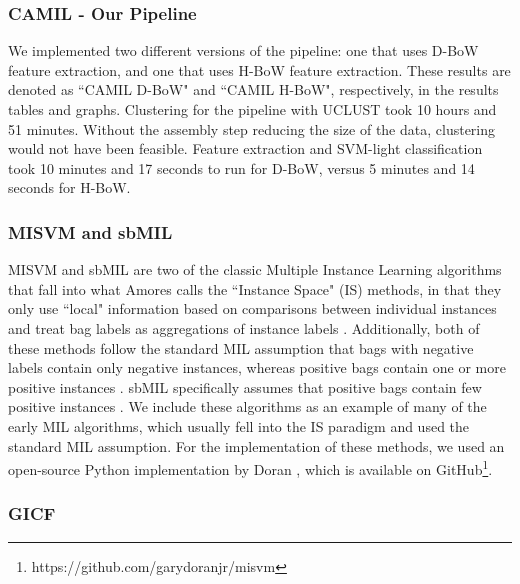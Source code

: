 \subsubsection{CAMIL - Our Pipeline}

We implemented two different versions of the pipeline: one that uses D-BoW feature extraction, and one that uses H-BoW feature extraction. These results are denoted as ``CAMIL D-BoW" and ``CAMIL H-BoW", respectively, in the results tables and graphs. Clustering for the pipeline with UCLUST took 10 hours and 51 minutes. Without the assembly step reducing the size of the data, clustering would not have been feasible. Feature extraction and SVM-light classification took 10 minutes and 17 seconds to run for D-BoW, versus 5 minutes and 14 seconds for H-BoW.

\subsubsection{MISVM and sbMIL}

MISVM \cite{andrews02} and sbMIL \cite{bunescu07} are two of the classic Multiple Instance Learning algorithms that fall into what Amores calls the ``Instance Space" (IS) methods, in that they only use ``local" information based on comparisons between individual instances and treat bag labels as aggregations of instance labels \cite{amores13}. Additionally, both of these methods follow the standard MIL assumption that bags with negative labels contain only negative instances, whereas positive bags contain one or more positive instances \cite{amores13}. sbMIL specifically assumes that positive bags contain few positive instances \cite{bunescu07}. We include these algorithms as an example of many of the early MIL algorithms, which usually fell into the IS paradigm and used the standard MIL assumption. For the implementation of these methods, we used an open-source Python implementation by Doran \cite{doran14}, which is available on GitHub\footnote{https://github.com/garydoranjr/misvm}.

\subsubsection{GICF}

